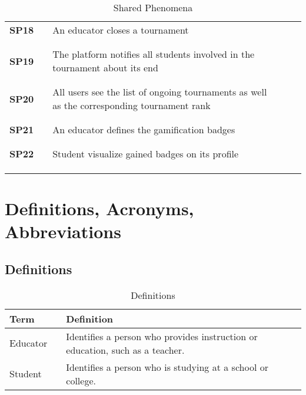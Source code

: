 \begin{longtable}[H]{l l p{8.5cm} l l}
        \textbf{SP18} & \vline & An educator closes a tournament & \vline & \\
                      & & & & \\\hline & & & & \\
        \textbf{SP19} & \vline & The platform notifies all students involved in the tournament about its end & \vline & \\
                      & & & & \\\hline & & & & \\
        \textbf{SP20} & \vline & All users see the list of  ongoing tournaments as well as the corresponding tournament rank & \vline & \\
                      & & & & \\\hline & & & & \\
        \textbf{SP21} & \vline & An educator defines the gamification badges & \vline & \\
                      & & & & \\\hline & & & & \\
        \textbf{SP22} & \vline & Student visualize gained badges on its profile & \vline & \\
                      & & & & \\
    \hline & & & & \\
\caption{Shared Phenomena}
\end{longtable}
    
\section{Definitions, Acronyms, Abbreviations}

\subsection{Definitions}
\begin{table}[H]
    \centering
    \renewcommand{\arraystretch}{1.5} 
    \begin{tabular}{l l p{11.5cm}}
    \hline
        \textbf{Term}       & & \textbf{Definition} \\                                                                                                
    \hline
        Educator            & & Identifies a person who provides instruction or education, such as a teacher. \\                                                                                                
        Student             & & Identifies a person who is studying at a school or college. \\ 
    \hline
    \end{tabular}
    \caption{Definitions}
\end{table}

